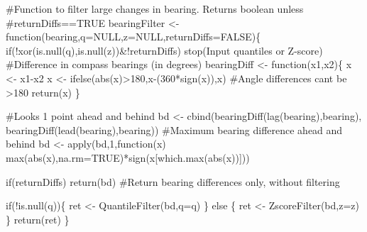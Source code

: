 \documentclass[]{elsarticle} %
\newenvironment{Shaded}{}{}
\newcommand{\AttributeTok}[1]{#1}
\newcommand{\CommentTok}[1]{\textcolor[rgb]{0.00,0.50,0.00}{#1}}
\newcommand{\ConstantTok}[1]{#1}
\newcommand{\ControlFlowTok}[1]{\textcolor[rgb]{0.00,0.00,1.00}{#1}}
\newcommand{\DecValTok}[1]{#1}
\newcommand{\FunctionTok}[1]{#1}
\newcommand{\NormalTok}[1]{#1}
\newcommand{\OtherTok}[1]{\textcolor[rgb]{1.00,0.25,0.00}{#1}}
\newcommand{\SpecialCharTok}[1]{\textcolor[rgb]{0.00,0.50,0.50}{#1}}
\newcommand{\StringTok}[1]{\textcolor[rgb]{0.00,0.50,0.50}{#1}}
\begin{document}
\begin{Shaded}
\begin{Highlighting}[]
\CommentTok{\#Function to filter large changes in bearing. Returns boolean unless}
\CommentTok{\#returnDiffs==TRUE}
\NormalTok{bearingFilter }\OtherTok{\textless{}{-}} \ControlFlowTok{function}\NormalTok{(bearing,}\AttributeTok{q=}\ConstantTok{NULL}\NormalTok{,}\AttributeTok{z=}\ConstantTok{NULL}\NormalTok{,}\AttributeTok{returnDiffs=}\ConstantTok{FALSE}\NormalTok{)\{}
  \ControlFlowTok{if}\NormalTok{(}\SpecialCharTok{!}\FunctionTok{xor}\NormalTok{(}\FunctionTok{is.null}\NormalTok{(q),}\FunctionTok{is.null}\NormalTok{(z))}\SpecialCharTok{\&!}\NormalTok{returnDiffs) }\FunctionTok{stop}\NormalTok{(}\StringTok{\textquotesingle{}Input quantiles or Z{-}score\textquotesingle{}}\NormalTok{)}
  \CommentTok{\#Difference in compass bearings (in degrees)}
\NormalTok{  bearingDiff }\OtherTok{\textless{}{-}} \ControlFlowTok{function}\NormalTok{(x1,x2)\{}
\NormalTok{    x }\OtherTok{\textless{}{-}}\NormalTok{ x1}\SpecialCharTok{{-}}\NormalTok{x2}
\NormalTok{    x }\OtherTok{\textless{}{-}} \FunctionTok{ifelse}\NormalTok{(}\FunctionTok{abs}\NormalTok{(x)}\SpecialCharTok{\textgreater{}}\DecValTok{180}\NormalTok{,x}\SpecialCharTok{{-}}\NormalTok{(}\DecValTok{360}\SpecialCharTok{*}\FunctionTok{sign}\NormalTok{(x)),x) }\CommentTok{\#Angle differences can\textquotesingle{}t be \textgreater{}180}
    \FunctionTok{return}\NormalTok{(x)}
\NormalTok{  \}}
  
  \CommentTok{\#Looks 1 point ahead and behind}
\NormalTok{  bd }\OtherTok{\textless{}{-}} \FunctionTok{cbind}\NormalTok{(}\FunctionTok{bearingDiff}\NormalTok{(}\FunctionTok{lag}\NormalTok{(bearing),bearing),}
              \FunctionTok{bearingDiff}\NormalTok{(}\FunctionTok{lead}\NormalTok{(bearing),bearing))}
  \CommentTok{\#Maximum bearing difference ahead and behind}
\NormalTok{  bd }\OtherTok{\textless{}{-}} \FunctionTok{apply}\NormalTok{(bd,}\DecValTok{1}\NormalTok{,}\ControlFlowTok{function}\NormalTok{(x) }\FunctionTok{max}\NormalTok{(}\FunctionTok{abs}\NormalTok{(x),}\AttributeTok{na.rm=}\ConstantTok{TRUE}\NormalTok{)}\SpecialCharTok{*}\FunctionTok{sign}\NormalTok{(x[}\FunctionTok{which.max}\NormalTok{(}\FunctionTok{abs}\NormalTok{(x))])) }
  
  \ControlFlowTok{if}\NormalTok{(returnDiffs) }\FunctionTok{return}\NormalTok{(bd) }\CommentTok{\#Return bearing differences only, without filtering}
  
  \ControlFlowTok{if}\NormalTok{(}\SpecialCharTok{!}\FunctionTok{is.null}\NormalTok{(q))\{}
\NormalTok{    ret }\OtherTok{\textless{}{-}} \FunctionTok{QuantileFilter}\NormalTok{(bd,}\AttributeTok{q=}\NormalTok{q)}
\NormalTok{  \} }\ControlFlowTok{else}\NormalTok{ \{}
\NormalTok{    ret }\OtherTok{\textless{}{-}} \FunctionTok{ZscoreFilter}\NormalTok{(bd,}\AttributeTok{z=}\NormalTok{z)}
\NormalTok{  \}}
  \FunctionTok{return}\NormalTok{(ret)}
\NormalTok{\} }



\end{Highlighting}
\end{Shaded}
\end{document}
